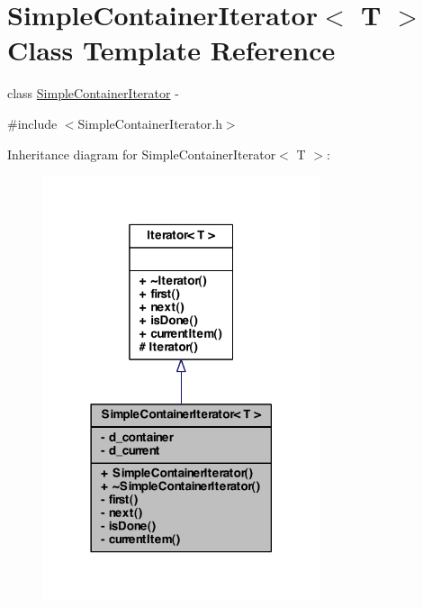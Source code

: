 \hypertarget{class_simple_container_iterator}{
\section{SimpleContainerIterator$<$ T $>$ Class Template Reference}
\label{class_simple_container_iterator}
}


class \hyperlink{class_simple_container_iterator}{SimpleContainerIterator} -\/  




{\ttfamily \#include $<$SimpleContainerIterator.h$>$}



Inheritance diagram for SimpleContainerIterator$<$ T $>$:
\nopagebreak
\begin{figure}[H]
\begin{center}
\leavevmode
\includegraphics[width=230pt]{class_simple_container_iterator__inherit__graph}
\end{center}
\end{figure}


